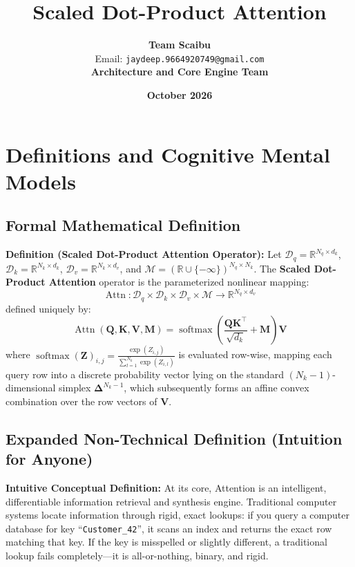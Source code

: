 \documentclass[11pt,a4paper]{article}
\title{\textbf{Scaled Dot-Product Attention}}
\author{\textbf{Team Scaibu} \\ \small Email: \texttt{jaydeep.9664920749@gmail.com} \\ \small \textbf{Architecture and Core Engine Team}}
\date{\textbf{October 2026}}
\theoremstyle{definition}
\begin{document}
\maketitle

\section{Definitions and Cognitive Mental Models}

\subsection{Formal Mathematical Definition}
\textbf{Definition (Scaled Dot-Product Attention Operator):}
Let $\boldsymbol{\mathcal{D}}_q = \mathbb{R}^{N_q \times d_k}$, $\boldsymbol{\mathcal{D}}_k = \mathbb{R}^{N_k \times d_k}$, $\boldsymbol{\mathcal{D}}_v = \mathbb{R}^{N_k \times d_v}$, and $\boldsymbol{\mathcal{M}} = (\mathbb{R} \cup \{-\infty\})^{N_q \times N_k}$. The \textbf{Scaled Dot-Product Attention} operator is the parameterized nonlinear mapping:
{\boldmath
\begin{equation}
\operatorname{Attn}: \boldsymbol{\mathcal{D}}_q \times \boldsymbol{\mathcal{D}}_k \times \boldsymbol{\mathcal{D}}_v \times \boldsymbol{\mathcal{M}} \longrightarrow \mathbb{R}^{N_q \times d_v}
\end{equation}
}
defined uniquely by:
{\boldmath
\begin{equation}
\operatorname{Attn}(\mathbf{Q}, \mathbf{K}, \mathbf{V}, \mathbf{M}) = \operatorname{softmax}\left(\frac{\mathbf{Q}\mathbf{K}^\top}{\sqrt{d_k}} + \mathbf{M}\right)\mathbf{V}
\end{equation}
}
where $\operatorname{softmax}(\mathbf{Z})_{i, j} = \frac{\exp(Z_{i, j})}{\sum_{l=1}^{N_k} \exp(Z_{i, l})}$ is evaluated row-wise, mapping each query row into a discrete probability vector lying on the standard $(N_k - 1)$-dimensional simplex $\boldsymbol{\Delta}^{N_k - 1}$, which subsequently forms an affine convex combination over the row vectors of $\mathbf{V}$.

\subsection{Expanded Non-Technical Definition (Intuition for Anyone)}
\textbf{Intuitive Conceptual Definition:}
At its core, Attention is an intelligent, differentiable information retrieval and synthesis engine. Traditional computer systems locate information through rigid, exact lookups: if you query a computer database for key ``\texttt{Customer\_42}'', it scans an index and returns the exact row matching that key. If the key is misspelled or slightly different, a traditional lookup fails completely—it is all-or-nothing, binary, and rigid.
\end{document}
